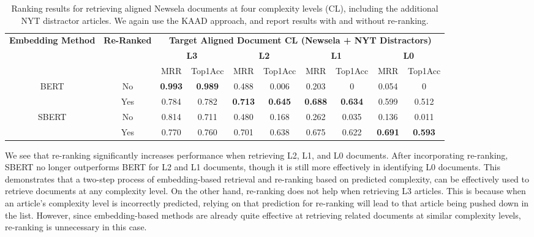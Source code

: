\documentclass[thesis.tex]{subfiles}
\begin{document}
\begin{table}
\begin{center}
\scriptsize
\begin{tabular}{|cc|cc|cc|cc|cc|}
\hline
\multirow{3}{1.7cm}{\centering \textbf{Embedding Method}} & \multirow{3}{1.2cm}{\centering \textbf{Re-Ranked}} &  \multicolumn{8}{|c|}{\textbf{Target Aligned Document CL (Newsela + NYT Distractors)}} \\
& & \multicolumn{2}{|c|}{\textbf{L3}} & \multicolumn{2}{|c|}{\textbf{L2}} & \multicolumn{2}{|c|}{\textbf{L1}} & \multicolumn{2}{|c|}{\textbf{L0}} \\
& & MRR & Top1Acc & MRR & Top1Acc & MRR & Top1Acc & MRR & Top1Acc \\ \hline
\multirow{2}{1.7cm}{\centering BERT} & No & \textbf{0.993} & \textbf{0.989} & 0.488 & 0.006 & 0.203 & 0 & 0.054 & 0 \\
& Yes & 0.784 & 0.782 & \textbf{0.713} & \textbf{0.645} & \textbf{0.688} & \textbf{0.634} & 0.599 & 0.512 \\ \hline
\multirow{2}{1.7cm}{\centering SBERT} & No & 0.814 & 0.711 & 0.480 & 0.168 & 0.262 & 0.035 & 0.136 & 0.011 \\
& Yes & 0.770 & 0.760 & 0.701 & 0.638 & 0.675 & 0.622 & \textbf{0.691} & \textbf{0.593} \\ \hline
\end{tabular}
\end{center}
\caption{\label{table:ir_rerank_nyt} Ranking results for retrieving aligned Newsela documents at four complexity levels (CL), including the additional NYT distractor articles. We again use the KAAD approach, and report results with and without re-ranking.}
\end{table}

We see that re-ranking significantly increases performance when retrieving L2, L1, and L0 documents. After incorporating re-ranking, SBERT no longer outperforms BERT for L2 and L1 documents, though it is still more effectively in identifying L0 documents. This demonstrates that a two-step process of embedding-based retrieval and re-ranking based on predicted complexity, can be effectively used to retrieve documents at any complexity level. On the other hand, re-ranking does not help when retrieving L3 articles. This is because when an article's complexity level is incorrectly predicted, relying on that prediction for re-ranking will lead to that article being pushed down in the list. However, since embedding-based methods are already quite effective at retrieving related documents at similar complexity levels, re-ranking is unnecessary in this case.
\end{document}
